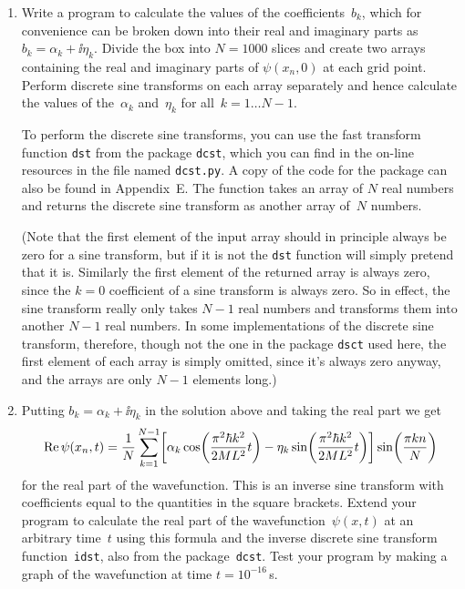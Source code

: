\documentclass[12pt]{article}
\begin{document}
\begin{exercises}
\begin{enumerate}\setlength{\itemsep}{0pt}
\item Write a program to calculate the values of the coefficients~$b_k$,
  which for convenience can be broken down into their real and imaginary
  parts as $b_k=\alpha_k+\ii\eta_k$.  Divide the box into $N=1000$ slices
  and create two arrays containing the real and imaginary parts of
  $\psi(x_n,0)$ at each grid point.  Perform discrete sine
  transforms on each array separately and hence calculate the values of
  the~$\alpha_k$ and~$\eta_k$ for all~$k=1\ldots N-1$.

  To perform the discrete sine transforms, you can use the fast transform
  function \verb|dst| from the package \verb|dcst|, which you can find in
  the on-line resources in the file named \verb|dcst.py|.  A copy of the
  code for the package can also be found in Appendix~E.  The function takes
  an array of $N$ real numbers and returns the discrete sine transform as
  another array of~$N$ numbers.

  (Note that the first element of the input array should in principle
  always be zero for a sine transform, but if it is not the \Verb|dst|
  function will simply pretend that it is.  Similarly the first element of
  the returned array is always zero, since the $k=0$ coefficient of a sine
  transform is always zero.  So in effect, the sine transform really only
  takes $N-1$ real numbers and transforms them into another $N-1$ real
  numbers.  In some implementations of the discrete sine transform,
  therefore, though not the one in the package \Verb|dsct| used here, the
  first element of each array is simply omitted, since it's always zero
  anyway, and the arrays are only $N-1$ elements long.)
\item Putting $b_k=\alpha_k+\ii\eta_k$ in the solution above and taking the
  real part we get
\begin{displaymath}
\Re \psi(x_n,t) = {1\over N} \sum_{k=1}^{N-1}
            \biggl[ \alpha_k \cos \biggl( {\pi^2\hbar k^2\over2ML^2} t \biggr)
            - \eta_k \sin \biggl( {\pi^2\hbar k^2\over2ML^2} t \biggr) \biggr]
            \sin \biggl( {\pi k n\over N} \biggr)
\end{displaymath}
for the real part of the wavefunction.  This is an inverse sine
transform with coefficients equal to the quantities in the square brackets.
Extend your program to calculate the real part of the
wavefunction~$\psi(x,t)$ at an arbitrary time~$t$ using this formula and
the inverse discrete sine transform function~\verb|idst|, also from the
package~\verb|dcst|.  Test your program by making a graph of the
wavefunction at time $t=10^{-16}\,$s.


\end{enumerate}
\end{exercises}
\end{document}
